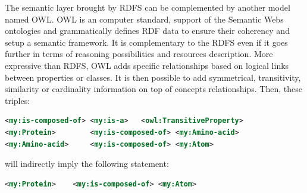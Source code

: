 \documentclass{vgtc}                          %
\begin{document}



The semantic layer brought by RDFS can be complemented by another model named OWL. OWL is an computer standard, support of the Semantic Webs ontologies and grammatically defines RDF data to ensure their coherency and setup a semantic framework. It is complementary to the RDFS even if it goes further in terms of reasoning possibilities and resources description. More expressive than RDFS, OWL adds specific relationships based on logical links between properties or classes. It is then possible to add symmetrical, transitivity, similarity or cardinality information on top of concepts relationships.
Then, these triples:
\begin{lstlisting}[language=XML]
<my:is-composed-of>	<my:is-a>	<owl:TransitiveProperty>
<my:Protein>		<my:is-composed-of>	<my:Amino-acid>
<my:Amino-acid>		<my:is-composed-of>	<my:Atom>
\end{lstlisting}
will indirectly imply the following statement:
\begin{lstlisting}[language=XML]
<my:Protein>	<my:is-composed-of>	<my:Atom>
\end{lstlisting}
\end{document}
